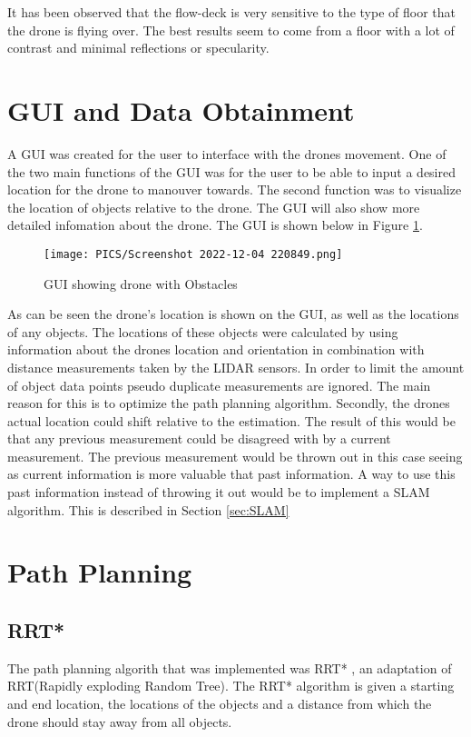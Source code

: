 \documentclass{article}
\begin{document}
It has been observed that the flow-deck is very sensitive to the type of floor that the drone is flying over.
The best results seem to come from a floor with a lot of contrast and minimal reflections or specularity.

\section{GUI and Data Obtainment}
A GUI was created for the user to interface with the drones movement. One of the two main functions of the GUI was for the user to be able to input a desired location for the drone to manouver towards. The second function was to visualize the location of objects relative to the drone. The GUI will also show more detailed infomation about the drone. The GUI is shown below in Figure \ref{fig:GUI}.

\begin{figure}[H]
\centering
\texttt{[image: PICS/Screenshot 2022-12-04 220849.png]}
\caption{\label{fig:GUI}GUI showing drone with Obstacles}
\end{figure}

As can be seen the drone's location is shown on the GUI, as well as the locations of any objects. The locations of these objects were calculated by using information about the drones location and orientation in combination with distance measurements taken by the LIDAR sensors. In order to limit the amount of object data points pseudo duplicate measurements are ignored. The main reason for this is to optimize the path planning algorithm. Secondly, the drones actual location could shift relative to the estimation. The result of this would be that any previous measurement could be disagreed with by a current measurement. The previous measurement would be thrown out in this case seeing as current information is more valuable that past information. A way to use this past information instead of throwing it out would be to implement a SLAM algorithm. This is described in Section \ref{sec:SLAM}


\section{Path Planning}
\subsection{RRT*}
The path planning algorith that was implemented was RRT* , an adaptation of RRT(Rapidly exploding Random Tree). The RRT* algorithm is given a starting and end location, the locations of the objects and a distance from which the drone should stay away from all objects.
\end{document}
